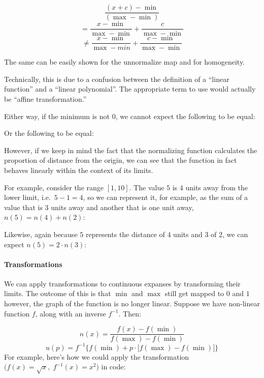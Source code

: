 \documentclass[
]{book}
\theoremstyle{definition}
\theoremstyle{definition}
\theoremstyle{definition}
\theoremstyle{definition}
\theoremstyle{remark}
\begin{document}
\[\frac{(x + c) - \min}{(\max - \min)}\]
\[= \frac{x - \min}{\max - \min} + \frac{c}{\max - \min}\]
\[\neq \frac{x - \min}{\max - min} + \frac{c - \min}{\max - \min}\]

The same can be easily shown for the \(\text{unnormalize}\) map and for homogeneity.

Technically, this is due to a confusion between the definition of a ``linear function'' and a ``linear polynomial''. The appropriate term to use would actually be ``affine transformation.''

Either way, if the minimum is not 0, we cannot expect the following to be equal:

Or the following to be equal:

However, if we keep in mind the fact that the normalizing function calculates the proportion of distance from the origin, we can see that the function in fact behaves linearly within the context of its limits.

For example, consider the range \([1, 10]\). The value \(5\) is \(4\) units away from the lower limit, i.e.~\(5 - 1 = 4\), so we can represent it, for example, as the sum of a value that is 3 units away and another that is one unit away, \(n(5) = n(4) + n(2)\):

Likewise, again because \(5\) represents the distance of \(4\) units and \(3\) of \(2\), we can expect \(n(5) = 2 \cdot n(3)\):

\paragraph{Transformations}\label{transformations}

We can apply transformations to continuous expanses by transforming their limits. The outcome of this is that \(\min\) and \(\max\) still get mapped to \(0\) and \(1\) however, the graph of the function is no longer linear. Suppose we have non-linear function \(f\), along with an inverse \(f^{-1}\). Then:

\[n(x) = \frac{f(x) - f(\min)}{f(\max) - f(\min)}\]
\[u(p) = f^{-1} \bigg\{f(\min) + p \cdot \big[ f(\max) - f(\min) \big] \bigg\}\]
For example, here's how we could apply the transformation \(\bigg( f(x) = \sqrt{x}, \; f^{-1}(x) = x^2 \bigg)\) in code:
\end{document}

